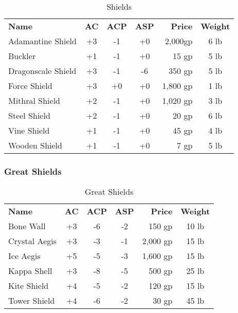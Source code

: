 \begin{table}[htb]
\caption{Shields}
\centering
\begin{tabular}{l *{3}{c} r c}
\textbf{Name} & \textbf{AC} & \textbf{ACP} & \textbf{ASP} & \textbf{Price} & \textbf{Weight}\\
Adamantine Shield & +3 & -1 & +0 & 2,000gp & 6 lb\\
Buckler & +1 & -1 & +0 & 15 gp & 5 lb\\
Dragonscale Shield & +3 & -1 & -6 & 350 gp & 5 lb\\
Force Shield & +3 & +0 & +0 & 1,800 gp & 1 lb\\
Mithral Shield & +2 & -1 & +0 & 1,020 gp & 3 lb\\
Steel Shield & +2 & -1 & +0 & 20 gp & 6 lb\\
Vine Shield & +1 & -1 & +0 & 45 gp & 4 lb\\
Wooden Shield & +1 & -1 & +0 & 7 gp & 5 lb\\
\end{tabular}
\end{table}


\subsubsection{Great Shields}

\begin{table}[htb]
\caption{Great Shields}
\centering
\begin{tabular}{l *{3}{c} r c}
\textbf{Name} & \textbf{AC} & \textbf{ACP} & \textbf{ASP} & \textbf{Price} & \textbf{Weight}\\
Bone Wall & +3 & -6 & -2 & 150 gp & 10 lb\\
Crystal Aegis & +3 & -3 & -1 & 2,000 gp & 15 lb\\
Ice Aegis & +5 & -5 & -3 & 1,600 gp & 15 lb\\
Kappa Shell & +3 & -8 & -5 & 500 gp & 25 lb\\
Kite Shield & +4  & -5 & -2 & 120 gp & 15 lb\\
Tower Shield & +4 & -6 & -2 & 30 gp & 45 lb\\
\end{tabular}
\end{table}


